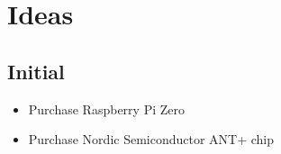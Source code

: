 \documentclass[letterpaper]{article}
\begin{document}
\section{Ideas}

\subsection{Initial}


\begin{itemize}
   \item Purchase Raspberry Pi Zero
   \item Purchase Nordic Semiconductor ANT+ chip
\end{itemize}
\end{document}
